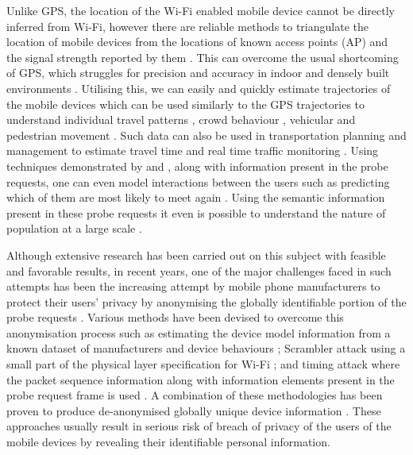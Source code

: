 Unlike GPS, the location of the Wi-Fi enabled mobile device cannot be directly inferred from Wi-Fi, however there are reliable methods to triangulate the location of mobile devices from the locations of known access points (AP) and the signal strength reported by them \citep{he2003, moore2004, lamarca2005}.
This can overcome the usual shortcoming of GPS, which struggles for precision and accuracy in indoor and densely built environments \citep{zarim2006, kawaguchi2009, xi2010}.
Utilising this, we can easily and quickly estimate trajectories of the mobile devices \citep{musa2012} which can be used similarly to the GPS trajectories to understand individual travel patterns \citep{rekimoto2007, sap2015}, crowd behaviour \citep{abedi2013, mowafi2013}, vehicular \citep{lu2010} and pedestrian movement \citep{xu2013, fukuzaki2014, wang2016}.
Such data can also be used in transportation planning and management to estimate travel time \citep{musa2011} and real time traffic monitoring \citep{abbott2013}.
Using techniques demonstrated by \citep{franklin2006} and \citep{pang2007}, along with information present in the probe requests, one can even model interactions between the users \citep{cheng2012, barbera2013, cunche2014} such as predicting which of them are most likely to meet again \citep{cunche2012}.
Using the semantic information present in these probe requests it even is possible to understand the nature of population at a large scale \citep{di2016}
.

Although extensive research has been carried out on this subject with feasible and favorable results, in recent years, one of the major challenges faced in such attempts has been the increasing attempt by mobile phone manufacturers to protect their users’ privacy by anonymising the globally identifiable portion of the probe requests \citep{greenstein2008}.
Various methods have been devised to overcome this anonymisation process such as estimating the device model information from a known dataset of manufacturers and device behaviours \citep{martin2016}; Scrambler attack using a small part of the physical layer specification for Wi-Fi \citep{vo2016, bloessl2015}; and timing attack where the packet sequence information along with information elements present in the probe request frame is used \citep{matte2016, cheng2016}. A combination of these methodologies has been proven to produce de-anonymised globally unique device information \citep{vanhoef2016, martin2017}. These approaches usually result in serious risk of breach of privacy of the users of the mobile devices by revealing their identifiable personal information.

